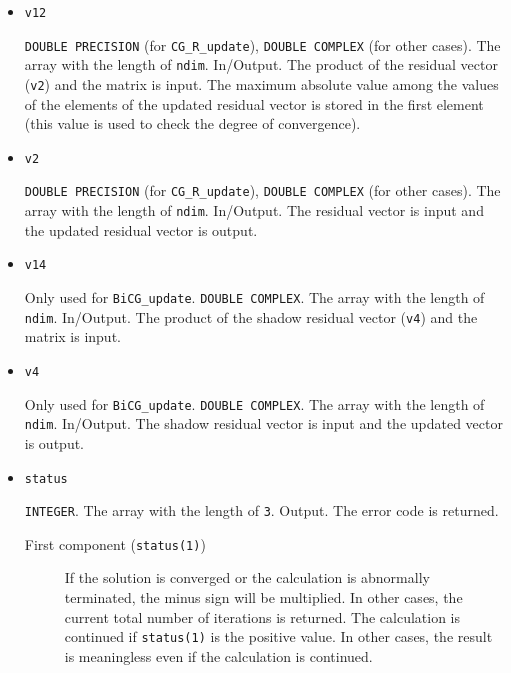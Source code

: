 \documentclass[12pt,titlepage]{article}
\begin{document}
\begin{itemize}

\item \verb|v12|

  \verb|DOUBLE PRECISION| (for \verb|CG_R_update|),
  \verb|DOUBLE COMPLEX| (for other cases).
  The array with the length of \verb|ndim|. In/Output.
  The product of the residual vector (\verb|v2|) and the matrix is input.
  The maximum absolute value among the values
  of the elements of the updated residual vector is stored
  in the first element (this value is used to check the degree of convergence).


\item \verb|v2|

  \verb|DOUBLE PRECISION| (for \verb|CG_R_update|),
  \verb|DOUBLE COMPLEX| (for other cases).
  The array with the length of \verb|ndim|. In/Output.
   The residual vector is input and the updated residual vector is output.

\item \verb|v14|
  
  Only used for \verb|BiCG_update|. \verb|DOUBLE COMPLEX|.
  The array with the length of \verb|ndim|. In/Output.
  The product of the shadow residual vector (\verb|v4|) and the matrix is input.
  
\item \verb|v4|
  
  Only used for \verb|BiCG_update|. \verb|DOUBLE COMPLEX|.
  The array with the length of \verb|ndim|. In/Output.
  The shadow residual vector is input and 
  the updated vector is output.

\item \verb|status|

  \verb|INTEGER|. 
  The array with the length of \verb|3|. Output. The error code is returned.
  \begin{description}
  \item [First component (\texttt{status(1)})]
     If the solution is converged or the calculation is abnormally terminated,
   the minus sign will be multiplied. In other cases, the current total number of iterations is returned.
   The calculation is continued if \verb|status(1)| is the positive value.
   In other cases, the result is meaningless even if the calculation is continued.
    

\end{description}
\end{itemize}
\end{document}
